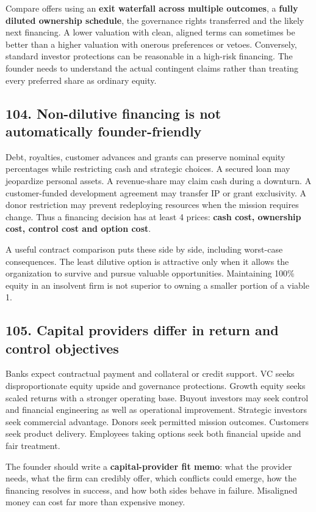 Compare offers using an \textbf{exit waterfall across multiple outcomes}, a \textbf{fully diluted ownership schedule}, the governance rights transferred and the likely next financing. A lower valuation with clean, aligned terms can sometimes be better than a higher valuation with onerous preferences or vetoes. Conversely, standard investor protections can be reasonable in a high-risk financing. The founder needs to understand the actual contingent claims rather than treating every preferred share as ordinary equity.

\subsection{104. Non-dilutive financing is not automatically founder-friendly}


Debt, royalties, customer advances and grants can preserve nominal equity percentages while restricting cash and strategic choices. A secured loan may jeopardize personal assets. A revenue-share may claim cash during a downturn. A customer-funded development agreement may transfer IP or grant exclusivity. A donor restriction may prevent redeploying resources when the mission requires change. Thus a financing decision has at least 4 prices: \textbf{cash cost, ownership cost, control cost and option cost}.

A useful contract comparison puts these side by side, including worst-case consequences. The least dilutive option is attractive only when it allows the organization to survive and pursue valuable opportunities. Maintaining 100\% equity in an insolvent firm is not superior to owning a smaller portion of a viable 1.

\subsection{105. Capital providers differ in return and control objectives}


Banks expect contractual payment and collateral or credit support. VC seeks disproportionate equity upside and governance protections. Growth equity seeks scaled returns with a stronger operating base. Buyout investors may seek control and financial engineering as well as operational improvement. Strategic investors seek commercial advantage. Donors seek permitted mission outcomes. Customers seek product delivery. Employees taking options seek both financial upside and fair treatment.

The founder should write a \textbf{capital-provider fit memo}: what the provider needs, what the firm can credibly offer, which conflicts could emerge, how the financing resolves in success, and how both sides behave in failure. Misaligned money can cost far more than expensive money.

